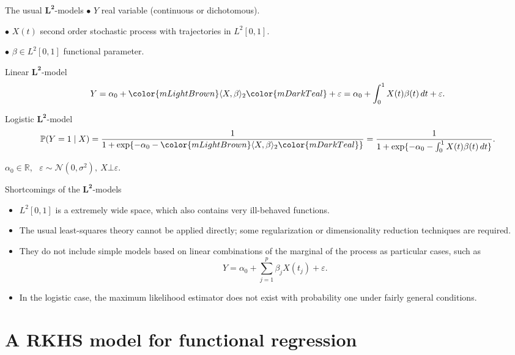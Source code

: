 \documentclass[10pt, english, professionalfonts]{beamer}
\newcommand\maroon[1]{\color{mLightBrown}#1\color{mDarkTeal}}
\begin{document}
\begin{frame}{The usual \(\bm{L^2}\)-models}
  \(\bullet\) \(Y\) real variable (continuous or dichotomous).

  \(\bullet\) \(X(t)\) second order stochastic process with trajectories in \(L^2[0, 1]\).

  \(\bullet\) \(\beta \in L^2[0,1]\) \maroon{functional parameter}.

  \vspace{1em}

\begin{block}{Linear \(\bm{L^2}\)-model}
  \[
    Y = \alpha_0 + \maroon{\langle X, \beta \rangle_2} + \varepsilon = \alpha_0 + \int_0^1 X(t)\beta(t)\, dt + \varepsilon.
  \]
\end{block}
\begin{block}{Logistic \(\bm{L^2}\)-model}
    \[
    \mathbb P (Y=1\mid X) = \frac{1}{1 + \exp\{-\alpha_0 - \maroon{\langle X, \beta\rangle_2}\}} = \frac{1}{1 + \exp\{-\alpha_0 - \int_0^1 X(t)\beta(t)\, dt\}}.
  \]
\end{block}
  \(\alpha_0\in\mathbb R\), \ \(\varepsilon \sim \mathcal N(0, \sigma^2), \ X \bot \varepsilon\).
\end{frame}


\begin{frame}{Shortcomings of the \(\bm{L^2}\)-models}
  \begin{itemize}
    \item \(L^2[0, 1]\) is a extremely wide space, which also contains very ill-behaved functions.
    \item The usual least-squares theory cannot be applied directly; some regularization or dimensionality reduction techniques are required.
    \item They do not include simple models based on linear combinations of the marginal of the process as particular cases, such as
    \[
      Y = \alpha_0 + \sum_{j=1}^p \beta_j X(t_j) + \varepsilon.
    \]
    \item In the logistic case, the maximum likelihood estimator does not exist with probability one under fairly general conditions.
  \end{itemize}
\end{frame}

\section{A RKHS model for functional regression}
\end{document}
